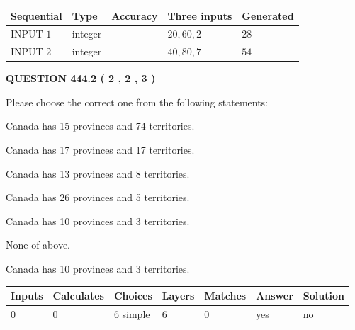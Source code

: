 \documentclass[12pt]{article}
\begin{document}
  
\noindent\begin{tabular}{|l|l|l|l|l|}
\hline
 Sequential & Type & Accuracy & Three inputs & Generated \\ 
\hline
 
 
  INPUT $  1 $ & integer &  & $
 20
 , 
 60
 , 
 2
 $ & $ 28 $ 
 \\  \hline  
 
 
  INPUT $  2 $ & integer &  & $
 40
 , 
 80
 , 
 7
 $ & $ 54 $ 
 \\  \hline  
 \end{tabular}
   
   
  
\vspace{0.2in}
  
{\textbf{\Large{QUESTION
444.2 
 ( 2 , 2 , 3 )
}}}
  
  
Please choose the correct one from the following statements:
 
 
Canada has  15 provinces and  74 territories.
 
 
Canada has  17 provinces and  17 territories.
 
 
Canada has  13 provinces and  8 territories.
 
 
Canada has  26 provinces and  5 territories.
 
 
Canada has 10  provinces and 3 territories.
 
 
 None of above.
 
 
\noindent{}
 
 
Canada has 10  provinces and 3 territories.
 
 
\noindent{}
 
 
   
   
   
   
\noindent\begin{tabular}{|l|l|l|l|l|l|l|}
 \hline
Inputs & Calculates & Choices & Layers & Matches & Answer & Solution \\ \hline
 0  & 
 0  & 
 6
  simple  
  & 
 6  & 
 0  & 
  yes & 
  no 
  \\ \hline
 \end{tabular}
   
\end{document}
